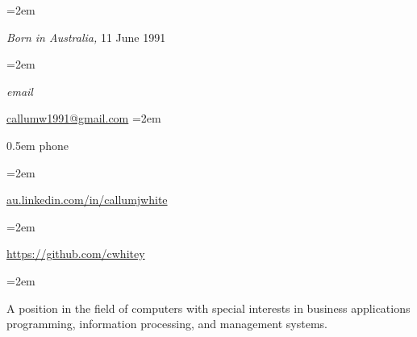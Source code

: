 \documentclass{article}
\newlength{\datebox}\settowidth{\datebox}{Jan 2011--Dec 2012} %
\newcommand{\NewEntry}[3]{\noindent\hangindent=2em\hangafter=0 \parbox{\datebox}{\small \textit{#1}}\hspace{1.5em} #2 #3 %
\vspace{0.5em}} %
\newcommand{\Description}[1]{\hangindent=2em\hangafter=0\noindent\raggedright\footnotesize{#1}\par\normalsize\vspace{1em}} %
\begin{document}
\thispagestyle{empty} %


\begin{cv}{}\vspace{1.5em} %

\noindent{}\vspace{0.5em} %

\NewEntry{}{\textit{Born in Australia,}}{11 June 1991} %

\NewEntry{email}{\href{mailto:callumw1991@gmail.com}{callumw1991@gmail.com}} %

\NewEntry{phone}{(M) (+61)410110691} %

\vspace{1em} %

\noindent{}\vspace{0.5em}

\Description{\href{au.linkedin.com/in/callumjwhite}{au.linkedin.com/in/callumjwhite}}

\vspace{1em} %

\noindent{}\vspace{0.5em}

\Description{\href{https://github.com/cwhitey}{https://github.com/cwhitey}}

\noindent{}\vspace{1em} %

\Description{A position in the field of computers with special interests in business applications programming, 
			information processing, and management systems.}\vspace{2em} %


\noindent{}\vspace{1em}


\end{cv}
\end{document}
